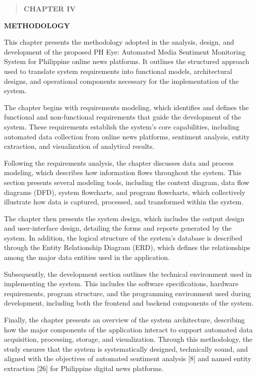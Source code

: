 \begin{quote}
\textbf{CHAPTER IV}
\end{quote}

\textbf{METHODOLOGY}

This chapter presents the methodology adopted in the analysis, design, and development of the proposed PH Eye: Automated Media Sentiment Monitoring System for Philippine online news platforms. It outlines the structured approach used to translate system requirements into functional models, architectural designs, and operational components necessary for the implementation of the system.

The chapter begins with requirements modeling, which identifies and defines the functional and non-functional requirements that guide the development of the system. These requirements establish the system's core capabilities, including automated data collection from online news platforms, sentiment analysis, entity extraction, and visualization of analytical results.

Following the requirements analysis, the chapter discusses data and process modeling, which describes how information flows throughout the system. This section presents several modeling tools, including the context diagram, data flow diagrams (DFD), system flowcharts, and program flowcharts, which collectively illustrate how data is captured, processed, and transformed within the system.

The chapter then presents the system design, which includes the output design and user-interface design, detailing the forms and reports generated by the system. In addition, the logical structure of the system's database is described through the Entity Relationship Diagram (ERD), which defines the relationships among the major data entities used in the application.

Subsequently, the development section outlines the technical environment used in implementing the system. This includes the software specifications, hardware requirements, program structure, and the programming environment used during development, including both the frontend and backend components of the system.

Finally, the chapter presents an overview of the system architecture, describing how the major components of the application interact to support automated data acquisition, processing, storage, and visualization. Through this methodology, the study ensures that the system is systematically designed, technically sound, and aligned with the objectives of automated sentiment analysis {[}8{]} and named entity extraction {[}26{]} for Philippine digital news platforms.


